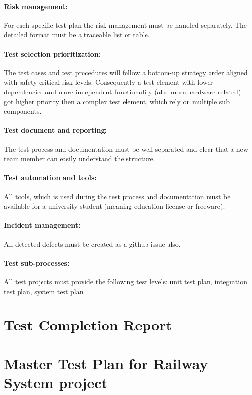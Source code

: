 \paragraph{Risk management:} For each specific test plan the risk management must be handled separately. The detailed format must be a traceable list or table. 
\paragraph{Test selection prioritization:} The test cases and test procedures will follow a bottom-up strategy order aligned with safety-critical risk levels. Consequently a test element with lower dependencies and more independent functionality (also more hardware related) got higher priority then a complex test element, which rely on multiple sub components.
\paragraph{Test document and reporting:} The test process and documentation must be well-separated and clear that a new team member can easily understand the structure.
\paragraph{Test automation and tools:} All tools, which is used during the test process and documentation must be available for a university student (meaning education license or freeware).
\paragraph{Incident management:} All detected defects must be created as a github issue also.
\paragraph{Test sub-processes:} All test projects must provide the following test levels: unit test plan, integration test plan, system test plan.


\section{Test Completion Report}

\section{Master Test Plan for Railway System project}\label{section:MTP}
